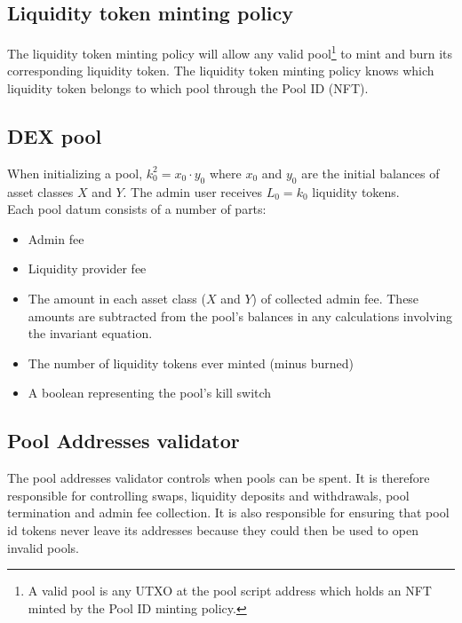 \documentclass{article}
\begin{document}
\subsection{Liquidity token minting policy}

The liquidity token minting policy will allow any valid pool\footnote{
  A valid pool is any UTXO at the pool script address which holds an NFT minted
  by the Pool ID minting policy.
} to mint and burn its corresponding liquidity token. The liquidity token
minting policy knows which liquidity token belongs to which pool through the
Pool ID (NFT).

\subsection{DEX pool}

When initializing a pool, $k_0^2 = x_0 \cdot y_0$ where $x_0$ and $y_0$ are the
initial balances of asset classes $X$ and $Y$. The admin user receives $L_0 =
k_0$ liquidity tokens. \\

Each pool datum consists of a number of parts:
\begin{itemize}
  \item Admin fee
  \item Liquidity provider fee
  \item The amount in each asset class ($X$ and $Y$) of collected admin fee.
    These amounts are subtracted from the pool's balances in any calculations
    involving the invariant equation.
  \item The number of liquidity tokens ever minted (minus burned)
  \item A boolean representing the pool's kill switch
\end{itemize}


\subsection{Pool Addresses validator}

The pool addresses validator controls when pools can be spent.
It is therefore responsible for controlling swaps,
liquidity deposits and withdrawals, pool termination
and admin fee collection.
It is also responsible for ensuring that
pool id tokens never leave its addresses
because they could then be used to open invalid pools.
\end{document}
